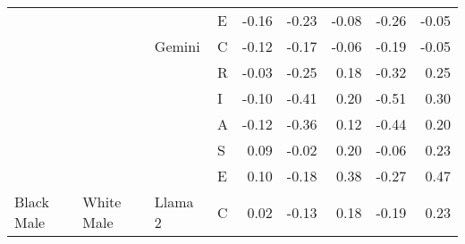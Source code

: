 \begin{table}
\begin{tabular}[t]{llllrrrrr}
 &  &  & E & -0.16 & -0.23 & -0.08 & -0.26 & -0.05\\

 &  & \multirow[t]{-6}{*}{\raggedright\arraybackslash Gemini} & C & -0.12 & -0.17 & -0.06 & -0.19 & -0.05\\

 &  &  & R & -0.03 & -0.25 & 0.18 & -0.32 & 0.25\\

 &  &  & I & -0.10 & -0.41 & 0.20 & -0.51 & 0.30\\

 &  &  & A & -0.12 & -0.36 & 0.12 & -0.44 & 0.20\\

 &  &  & S & 0.09 & -0.02 & 0.20 & -0.06 & 0.23\\

 &  &  & E & 0.10 & -0.18 & 0.38 & -0.27 & 0.47\\

\multirow[t]{-24}{*}{\raggedright\arraybackslash Black Male} & \multirow[t]{-24}{*}{\raggedright\arraybackslash White Male} & \multirow[t]{-6}{*}{\raggedright\arraybackslash Llama 2} & C & 0.02 & -0.13 & 0.18 & -0.19 & 0.23\\
\bottomrule
\end{tabular}
\end{table}
